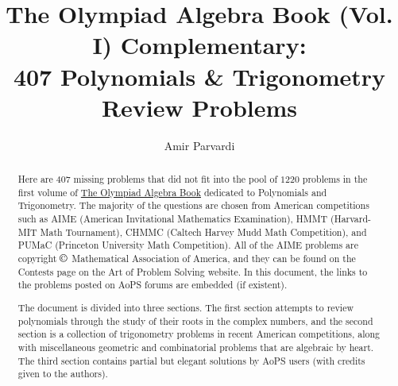 \documentclass[11pt]{article}
\title{The Olympiad Algebra Book (Vol. I) Complementary:\\407 Polynomials \& Trigonometry Review Problems}
\author{Amir Parvardi}
\theoremstyle{definition}
\begin{document}
	
	\pagestyle{fancy}
	\fancyhf{}




\maketitle
\begin{abstract}
	Here are $407$ missing problems that did not fit into the pool of $1220$ problems in the first volume of \href{https://www.academia.edu/101938068/The_Olympiad_Algebra_Book_Vol_I_1220_Polynomials_and_Trigonometry_Problems}{The Olympiad Algebra Book} dedicated to  Polynomials and Trigonometry. The majority of the questions are chosen from American competitions such as AIME (American Invitational Mathematics Examination), HMMT (Harvard-MIT Math Tournament), CHMMC (Caltech Harvey Mudd Math Competition), and PUMaC (Princeton University Math Competition). All of the AIME problems are copyright $\copyright$ Mathematical Association of America, and they can be found on the Contests page on the Art of Problem Solving website. In this document, the links to the problems posted on AoPS forums are embedded (if existent). 
	
	\vspace{1em}
	
	The document is divided into three sections. The first section attempts to review polynomials through the study of their roots in the complex numbers, and the second section is a collection of trigonometry problems in recent American competitions, along with miscellaneous geometric and combinatorial problems that are algebraic by heart. The third section contains partial but elegant solutions by AoPS users (with credits given to the authors).
\end{abstract}
\end{document}
